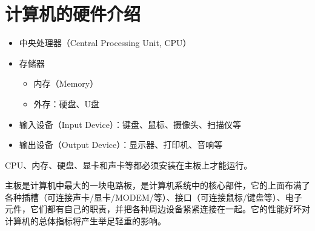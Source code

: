\section{计算机的硬件介绍}




\begin{frame}
\begin{itemize}
\item 中央处理器（Central Processing Unit, CPU）\\[0.1in]
\item 存储器\\[0.1in]
  \begin{itemize}
  \item 内存（Memory）\\[0.1in]
  \item 外存：硬盘、U盘\\[0.1in]
  \end{itemize}
\item 输入设备（Input Device）：键盘、鼠标、摄像头、扫描仪等\\[0.1in]
\item 输出设备（Output Device）：显示器、打印机、音响等
\end{itemize}
\end{frame}


\begin{frame}
{CPU、内存、硬盘、显卡和声卡等都必须安装在主板上才能运行。}

主板是计算机中最大的一块电路板，是计算机系统中的核心部件，它的上面布满了各种插槽（可连接声卡/显卡/MODEM/等）、接口（可连接鼠标/键盘等）、电子元件，它们都有自己的职责，并把各种周边设备紧紧连接在一起。它的性能好坏对计算机的总体指标将产生举足轻重的影响。
\end{frame}



